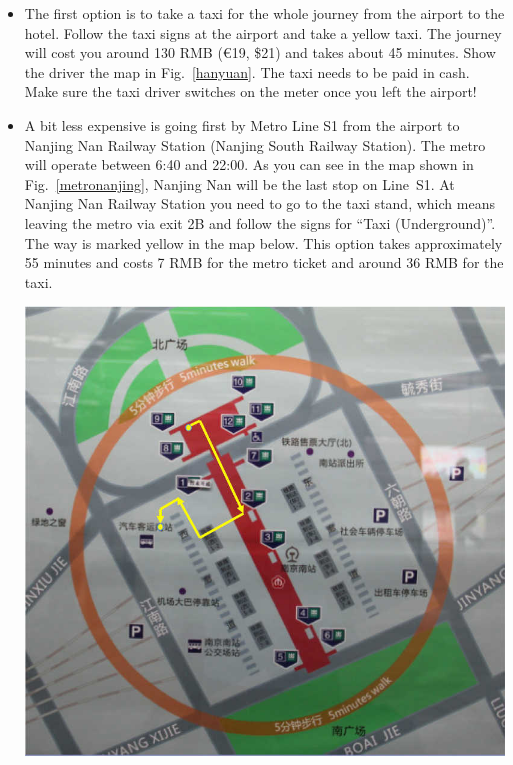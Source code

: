 \documentclass[11pt]{report}
\begin{document}
\begin{itemize}
\item The first option is to take a taxi for the whole journey
      from the airport to the hotel. Follow the taxi signs at
      the airport and take a yellow taxi. The journey will
      cost you around 130 RMB (\euro{}19, \$21) and takes
      about 45 minutes. Show the driver the map in
      Fig.~\ref{hanyuan}. The taxi needs to be paid in cash.
      Make sure the taxi driver switches on the meter once 
      you left the airport! 

\item A bit less expensive is going first by Metro Line S1
      from the airport to Nanjing Nan Railway Station (Nanjing
      South Railway Station). The metro will operate between
      6:40 and 22:00. As you can see in the map shown in
      Fig.~\ref{metronanjing}, Nanjing Nan will be the last
      stop on Line~S1. At Nanjing Nan Railway Station you need to go
      to the taxi stand, which means leaving the metro via exit 
      2B and follow the signs for ``Taxi (Underground)''.
      The way is marked yellow in the map below. 
      This option takes approximately
      55 minutes and costs 7 RMB for the metro ticket and
      around 36 RMB for the taxi.\\[-10mm]\mbox{}

      \begin{center}
      \includegraphics[scale=0.19]{travel_guide/ggg.jpg}
      \end{center}


\end{itemize}
\end{document}
